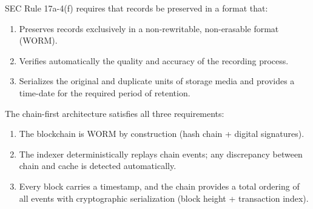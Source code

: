 SEC Rule 17a-4(f) requires that records be preserved in a format that:
\begin{enumerate}[nosep]
  \item Preserves records exclusively in a non-rewritable,
        non-erasable format (WORM).
  \item Verifies automatically the quality and accuracy of the
        recording process.
  \item Serializes the original and duplicate units of storage media
        and provides a time-date for the required period of retention.
\end{enumerate}

The chain-first architecture satisfies all three requirements:
\begin{enumerate}[nosep]
  \item The blockchain is WORM by construction (hash chain + digital
        signatures).
  \item The indexer deterministically replays chain events; any
        discrepancy between chain and cache is detected automatically.
  \item Every block carries a timestamp, and the chain provides a
        total ordering of all events with cryptographic serialization
        (block height + transaction index).
\end{enumerate}


